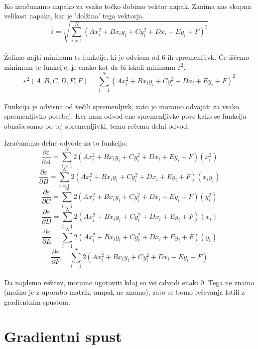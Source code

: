 \documentclass[a4paper, 12pt]{article}
\begin{document}
	\paragraph{}
	Ko izračunamo napako za vsako točko dobimo vektor napak. Zanima nas skupna velikost napake, kar je 'dolžina' tega vektorja.
	$$\varepsilon = \sqrt{\sum_{i=1}^{N} (Ax_i^2 + Bx_iy_i + Cy_i^2 + Dx_i + Ey_i + F)^2}$$
	
	\paragraph{}
	Želimo najti minimum te funkcije, ki je odvisna od 6-ih spremenljivk. Če iščemo minimum te funkcije, je enako kot da bi iskali minimum $\varepsilon^{2}$.
	$$\varepsilon^2(A, B, C, D, E, F) = \sum_{i=1}^{N} (Ax_i^2 + Bx_iy_i + Cy_i^2 + Dx_i + Ey_i + F)^2$$
	
	\paragraph{}
	Funkcija je odvisna od večih spremenljivk, zato jo moramo odvajati za vsako spremenljivko posebej. Ker nam odvod ene spremenljivke pove kako se funkcija obnaša samo po tej spremenljivki, temu rečemu delni odvod.
	
	Izračunamo delne odvode za to funkcijo:
	$$\frac{\partial \varepsilon}{\partial A} = \sum_{i=1}^{N}2(Ax_i^2 + Bx_iy_i + Cy_i^2 + Dx_i + Ey_i + F)(x_i^2)$$
	$$\frac{\partial \varepsilon}{\partial B} = \sum_{i=1}^{N}2(Ax_i^2 + Bx_iy_i + Cy_i^2 + Dx_i + Ey_i + F)(x_iy_i)$$
	$$\frac{\partial \varepsilon}{\partial C} = \sum_{i=1}^{N}2(Ax_i^2 + Bx_iy_i + Cy_i^2 + Dx_i + Ey_i + F)(y_i^2)$$
	$$\frac{\partial \varepsilon}{\partial D} = \sum_{i=1}^{N}2(Ax_i^2 + Bx_iy_i + Cy_i^2 + Dx_i + Ey_i + F)(x_i)$$
	$$\frac{\partial \varepsilon}{\partial E} = \sum_{i=1}^{N}2(Ax_i^2 + Bx_iy_i + Cy_i^2 + Dx_i + Ey_i + F)(y_i)$$
	$$\frac{\partial \varepsilon}{\partial F} = \sum_{i=1}^{N}2(Ax_i^2 + Bx_iy_i + Cy_i^2 + Dx_i + Ey_i + F)$$
	
	\paragraph{}
	Da najdemo rešitev, moramo ugotoviti kdaj so vsi odvodi enaki 0. Tega ne znamo (možno je z uporabo matrik, ampak ne znamo), zato se bomo reševanja lotili z gradientnim spustom.

	\section*{Gradientni spust}
\end{document}
